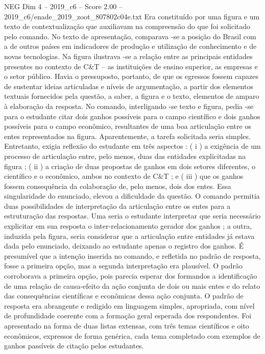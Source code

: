 \begin{textsample}{NEG Dim 4 – 2019\_c6 – Score 2.00 – 2019\_c6/enade\_2019\_zoot\_807802c04e.txt}
Era constituído por uma figura e um texto de contextualização que auxiliavam na compreensão do que foi solicitado pelo comando.
No texto de apresentação, comparava -se a posição do Brasil com a de outros países em indicadores de produção e utilização de conhecimento e de novas tecnologias.
Na figura ilustrava -se a relação entre as principais entidades presentes no contexto de C\&T – as instituições de ensino superior, as empresas e o setor público.
Havia o pressuposto, portanto, de que os egressos fossem capazes de sustentar ideias articuladas e níveis de argumentação, a partir dos elementos textuais fornecidos pela questão, a saber, a figura e o texto, elementos de amparo à elaboração da resposta.
No comando, interligando -se texto e figura, pedia -se para o estudante citar dois ganhos possíveis para o campo científico e dois ganhos possíveis para o campo econômico, resultantes de uma boa articulação entre os entes representados na figura.
Aparentemente, a tarefa solicitada seria simples.
Entretanto, exigia reflexão do estudante em três aspectos : ( i ) a exigência de um processo de articulação entre, pelo menos, duas das entidades explicitadas na figura ; ( ii ) a criação de duas propostas de ganhos em dois setores diferentes, o científico e o econômico, ambos no contexto de C\&T ; e ( iii ) que os ganhos fossem consequência da colaboração de, pelo menos, dois dos entes.
Essa singularidade do enunciado, elevou a dificuldade da questão.
O comando permitia duas possibilidades de interpretação da articulação entre os entes para a estruturação das respostas.
Uma seria o estudante interpretar que seria necessário explicitar em sua resposta o inter-relacionamento gerador dos ganhos ; a outra, induzida pela figura, seria considerar que a articulação entre entidades já estava dada pelo enunciado, deixando ao estudante apenas o registro dos ganhos.
É presumível que a intenção inserida no comando, e refletida no padrão de resposta, fosse a primeira opção, mas a segunda interpretação era plausível.
O padrão corroborava a primeira opção, pois parecia esperar dos formandos a identificação de uma relação de causa-efeito da ação conjunta de dois ou mais entes e do relato das consequências científicas e econômicas dessa ação conjunta.
O padrão de resposta era abrangente e redigido em linguagem simples, apropriada, com nível de profundidade coerente com a formação geral esperada dos respondentes.
Foi apresentado na forma de duas listas extensas, com três temas científicos e oito econômicos, expressos de forma genérica, cada tema completado com exemplos de ganhos passíveis de citação pelos estudantes.

\end{textsample}
